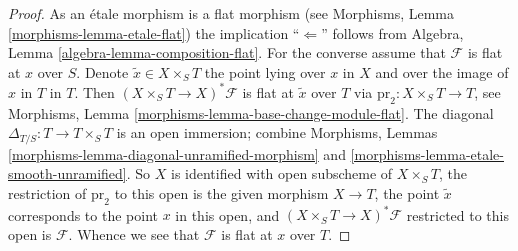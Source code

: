 \documentclass[10pt,a4paper]{amsart}
\theoremstyle{plain}
\theoremstyle{definition}
\theoremstyle{remark}
\numberwithin{equation}{subsection}
\begin{document}
\begin{proof}
As an \'etale morphism is a flat morphism (see
Morphisms, Lemma \ref{morphisms-lemma-etale-flat})
the implication ``$\Leftarrow$'' follows from
Algebra, Lemma \ref{algebra-lemma-composition-flat}.
For the converse assume that $\mathcal{F}$ is flat at $x$ over $S$.
Denote $\tilde x \in X \times_S T$ the point lying over $x$ in $X$
and over the image of $x$ in $T$ in $T$.
Then $(X \times_S T \to X)^*\mathcal{F}$ is flat at $\tilde x$ over $T$
via $\text{pr}_2 : X \times_S T \to T$, see
Morphisms, Lemma \ref{morphisms-lemma-base-change-module-flat}.
The diagonal $\Delta_{T/S} : T \to T \times_S T$ is an open immersion;
combine
Morphisms, Lemmas \ref{morphisms-lemma-diagonal-unramified-morphism} and
\ref{morphisms-lemma-etale-smooth-unramified}.
So $X$ is identified with open subscheme of $X \times_S T$,
the restriction of $\text{pr}_2$ to this open is the given morphism $X \to T$,
the point $\tilde x$ corresponds to the point $x$ in this open, and
$(X \times_S T \to X)^*\mathcal{F}$ restricted to this open is $\mathcal{F}$.
Whence we see that $\mathcal{F}$ is flat at $x$ over $T$.
\end{proof}
\end{document}
